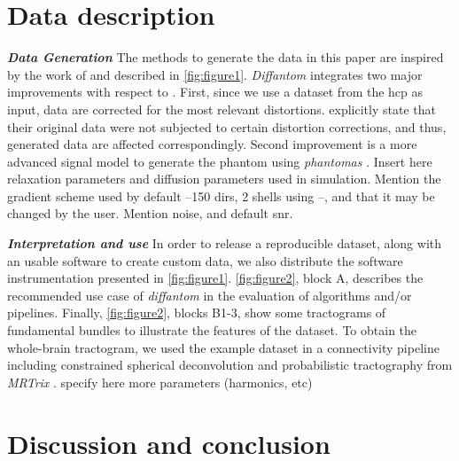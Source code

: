 \documentclass[english]{frontiers/frontiersSCNS} %
\begin{document}
\section*{Data description}

\noindent\textbf{\textit{Data Generation\textcolon}}
The methods to generate the data in this paper are inspired by the work of \cite{wilkins_fiber_2014} and
  described in \autoref{fig:figure1}.
\emph{Diffantom} integrates two major improvements with respect to \citep{wilkins_fiber_2014}.
First, since we use a dataset from the \gls*{hcp} as input, data are corrected for the most relevant distortions.
\cite{wilkins_fiber_2014} explicitly state that their original data were not subjected to certain distortion
  corrections, and thus, generated data are affected correspondingly.
Second improvement is a more advanced signal model to generate the phantom using
  \emph{phantomas} \citep{caruyer_phantomas_2014}.
{\color{red} Insert here relaxation parameters and diffusion parameters used in simulation. Mention the gradient
scheme used by default --150 dirs, 2 shells using \citep{caruyer_design_2013}--, and that it may be changed by
the user. Mention noise, and default snr.}


\noindent\textbf{\textit{Interpretation and use\textcolon}}
In order to release a reproducible dataset, along with an usable software to create custom data,
  we also distribute the software instrumentation presented in \autoref{fig:figure1}.
\autoref{fig:figure2}, block A, describes the recommended use case of \emph{diffantom} in the evaluation
  of algorithms and/or pipelines.
Finally, \autoref{fig:figure2}, blocks B1-3, show some tractograms of fundamental bundles to illustrate
  the features of the dataset.
To obtain the whole-brain tractogram, we used the example dataset in a connectivity pipeline including
  constrained spherical deconvolution and probabilistic tractography from
  \emph{MRTrix} \citep{tournier_mrtrix_2012}.
{\color{red} specify here more parameters (harmonics, etc)}

\section*{Discussion and conclusion}
\end{document}

